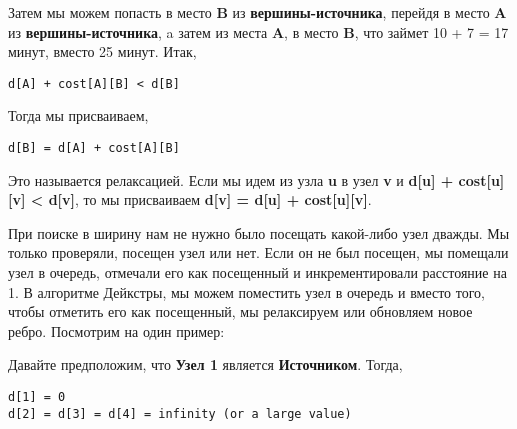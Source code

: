 \vspace{\baselineskip}
Затем мы можем попасть в место \textbf{B} из \textbf{вершины-источника}, перейдя в место \textbf{A} из \textbf{вершины-источника}, a затем из места \textbf{A}, в место \textbf{B}, что займет 10 + 7 = 17 минут, вместо 25 минут. Итак,

\vspace{\baselineskip}
\begin{tcolorbox}
\begin{verbatim} 
d[A] + cost[A][B] < d[B]
\end{verbatim}
\end{tcolorbox}

\vspace{\baselineskip}
Тогда мы присваиваем,

\vspace{\baselineskip}
\begin{tcolorbox}
\begin{verbatim} 
d[B] = d[A] + cost[A][B]
\end{verbatim}
\end{tcolorbox}

\vspace{\baselineskip}
Это называется релаксацией. Если мы идем из узла \textbf{u} в узел \textbf{v} и\textbf{ d[u] + cost[u][v] < d[v]}, то мы присваиваем \textbf{d[v] = d[u] + cost[u][v]}.

\vspace{\baselineskip}
При поиске в ширину нам не нужно было посещать какой-либо узел дважды. Мы только проверяли, посещен узел или нет. Если он не был посещен, мы помещали узел в очередь, отмечали его как посещенный и инкрементировали расстояние на 1. В алгоритме Дейкстры, мы можем поместить узел в очередь и вместо того, чтобы отметить его как посещенный, мы релаксируем или обновляем новое ребро. Посмотрим на один пример:

\vspace{\baselineskip}


\vspace{\baselineskip}
Давайте предположим, что \textbf{Узел 1} является \textbf{Источником}. Тогда,

\vspace{\baselineskip}
\begin{tcolorbox}
\begin{verbatim} 
d[1] = 0
d[2] = d[3] = d[4] = infinity (or a large value)
\end{verbatim}
\end{tcolorbox}

